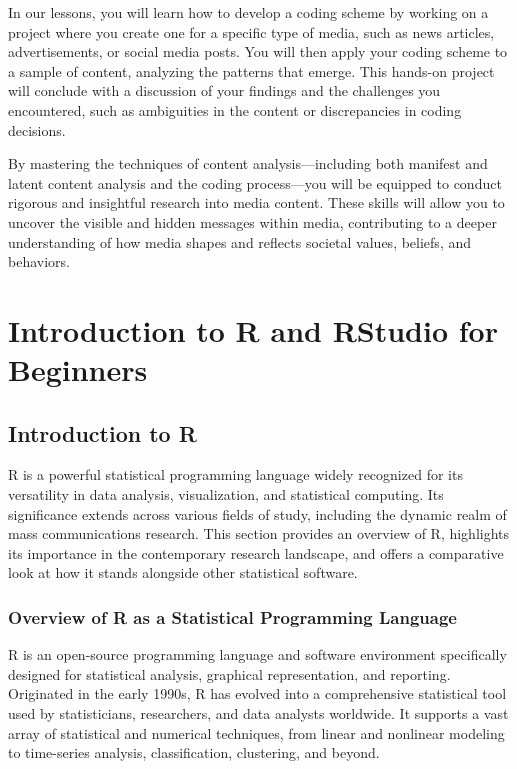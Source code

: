 \documentclass[
]{book}
\begin{document}
In our lessons, you will learn how to develop a coding scheme by working on a project where you create one for a specific type of media, such as news articles, advertisements, or social media posts. You will then apply your coding scheme to a sample of content, analyzing the patterns that emerge. This hands-on project will conclude with a discussion of your findings and the challenges you encountered, such as ambiguities in the content or discrepancies in coding decisions.

By mastering the techniques of content analysis---including both manifest and latent content analysis and the coding process---you will be equipped to conduct rigorous and insightful research into media content. These skills will allow you to uncover the visible and hidden messages within media, contributing to a deeper understanding of how media shapes and reflects societal values, beliefs, and behaviors.

\chapter{Introduction to R and RStudio for Beginners}\label{introduction-to-r-and-rstudio-for-beginners}

\section{Introduction to R}\label{introduction-to-r}

R is a powerful statistical programming language widely recognized for its versatility in data analysis, visualization, and statistical computing. Its significance extends across various fields of study, including the dynamic realm of mass communications research. This section provides an overview of R, highlights its importance in the contemporary research landscape, and offers a comparative look at how it stands alongside other statistical software.

\subsection*{Overview of R as a Statistical Programming Language}\label{overview-of-r-as-a-statistical-programming-language}

R is an open-source programming language and software environment specifically designed for statistical analysis, graphical representation, and reporting. Originated in the early 1990s, R has evolved into a comprehensive statistical tool used by statisticians, researchers, and data analysts worldwide. It supports a vast array of statistical and numerical techniques, from linear and nonlinear modeling to time-series analysis, classification, clustering, and beyond.
\end{document}

